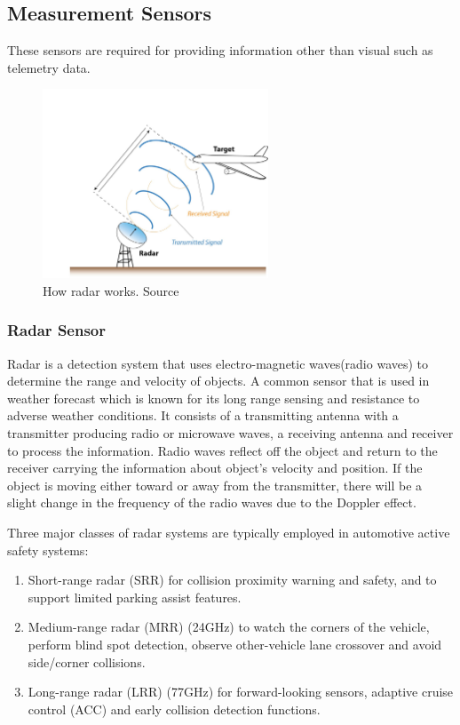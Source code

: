 \subsection{Measurement Sensors}
These sensors are required for providing information other than visual such as telemetry
data.
\begin{figure}[!ht]
	\centering
    \includegraphics[width=0.6\textwidth, scale=0.1]{figures/inkscape/RadarFig.jpg}
    \caption{How radar works. Source \cite{howradarworks}}
    \label{fig:radarsensor}
\end{figure}

\subsubsection*{Radar Sensor}
Radar is a detection system that uses electro-magnetic waves(radio waves) to determine the
range and velocity of objects. A common sensor that is used in weather forecast which is known for its
long range sensing and resistance to adverse weather conditions. It consists of a transmitting antenna with a
transmitter producing radio or microwave waves, a receiving antenna and receiver to
process the information. Radio waves reflect off the object and return to the receiver
carrying the information about object's velocity and position.
If the object is moving either toward or away from the transmitter, there will be a slight change in the frequency of the radio waves due to the Doppler effect.

Three major classes of radar systems are typically employed in automotive active safety systems:
\begin{enumerate}
    \item Short-range radar (SRR) for collision proximity warning and safety, and to support limited parking assist features.
    \item Medium-range radar (MRR) (24GHz) to watch the corners of the vehicle, perform blind spot detection, observe other-vehicle lane crossover and avoid side/corner collisions.
    \item Long-range radar (LRR) (77GHz) for forward-looking sensors, adaptive cruise control (ACC) and early collision detection functions.
\end{enumerate}


